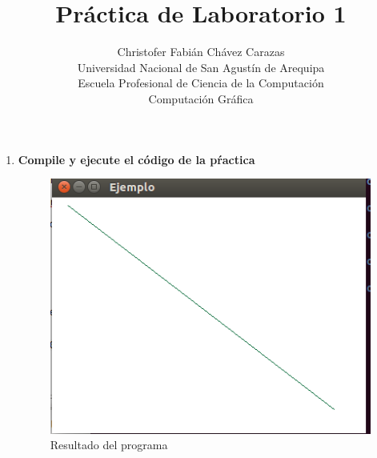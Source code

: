 \documentclass[a4paper,12pt]{article}
\begin{document}
\title{Práctica de Laboratorio 1}
\author{
Christofer Fabián Chávez Carazas \\
\small{Universidad Nacional de San Agustín de Arequipa} \\
\small{Escuela Profesional de Ciencia de la Computación} \\
\small{Computación Gráfica}
}
\date{}

\maketitle

\begin{enumerate}
 \item \textbf{Compile y ejecute el código de la pŕactica} 
 \begin{figure}[H]
  \centering
  \includegraphics[scale = 0.5]{1.png}
  \caption{Resultado del programa}
 \end{figure}
 

\end{enumerate}
\end{document}
